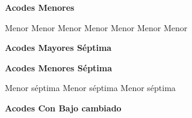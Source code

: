 \textbf{Acodes Menores}
\vskip 25pt

\small
{} Menor \qquad\qquad {} Menor  \qquad\qquad {} Menor  Menor \hfill \break
\vskip 25pt
 Menor  Menor  Menor
\vskip 25pt
      
\normalsize

\vskip 20pt
\textbf{Acodes Mayores S\'eptima}
\vskip 25pt

\vskip 20pt

\textbf{Acodes Menores S\'eptima}
\vskip 25pt

\small
{} Menor s\'eptima
 Menor s\'eptima
 Menor s\'eptima
\normalsize

\vskip 20pt
\textbf{Acodes Con Bajo cambiado}
\vskip 25pt

\small
{}
\normalsize

\clearpage
\fi
%
